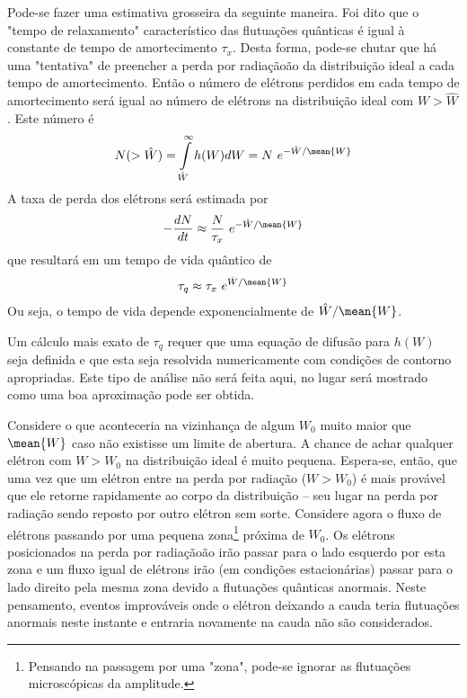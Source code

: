 Pode-se fazer uma estimativa grosseira da seguinte maneira. Foi dito que o "tempo de relaxamento" característico das flutuações quânticas é igual à constante de tempo de amortecimento $\tau_x$. Desta forma, pode-se chutar que há uma "tentativa" de preencher a perda por radiaçãoão da distribuição ideal a cada tempo de amortecimento. Então o número de elétrons perdidos em cada tempo de amortecimento será igual ao número de elétrons na distribuição ideal com $W> \hat{W}$. Este número é
\begin{align}
	N(>\hat{W}) = \int\limits_{\hat{W}}^{\infty}h(W)dW = N\ e^{-\hat{W}/\mean{W}}
\end{align}
A taxa de perda dos elétrons será estimada por
\begin{align}
	-\frac{dN}{dt} \approx \frac{N}{\tau_x}\ e^{-\hat{W}/\mean{W}}
\end{align}
que resultará em um tempo de vida quântico de
\begin{align}
	\tau_q \approx \tau_x\ e^{\hat{W}/\mean{W}}\label{eq:5.123}
\end{align}
Ou seja, o tempo de vida depende exponencialmente de $\hat{W}/\mean{W}$.

Um cálculo mais exato de $\tau_q$ requer que uma equação de difusão para $h(W)$ seja definida e que esta seja resolvida numericamente com condições de contorno apropriadas. Este tipo de análise não será feita aqui, no lugar será mostrado como uma boa aproximação pode ser obtida.

Considere o que aconteceria na vizinhança de algum $W_0$ muito maior que $\mean{W}$ caso não existisse um limite de abertura. A chance de achar qualquer elétron com $W>W_0$ na distribuição ideal é muito pequena. Espera-se, então, que uma vez que um elétron entre na perda por radiação ($W>W_0$) é mais provável que ele retorne rapidamente ao corpo da distribuição -- seu lugar na perda por radiação sendo reposto por outro elétron sem sorte. Considere agora o fluxo de elétrons passando por uma pequena zona\footnote{Pensando na passagem por uma "zona", pode-se ignorar as flutuações microscópicas da amplitude.} próxima de $W_0$. Os elétrons posicionados na perda por radiaçãoão irão passar para o lado esquerdo por esta zona e um fluxo igual de elétrons irão (em condições estacionárias) passar para o lado direito pela mesma zona devido a flutuações quânticas anormais. Neste pensamento, eventos improváveis onde o elétron deixando a cauda teria flutuações anormais neste instante e entraria novamente na cauda não são considerados.

